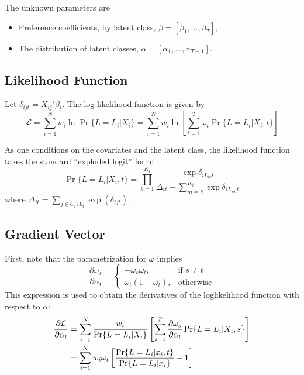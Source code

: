 \documentclass[12pt]{article}
\begin{document}
The unknown parameters are
\begin{itemize}
	\item Preference coefficients, by latent class, $\beta = [\beta_1,\dots, \beta_T]$,
	\item The distribution of latent classes, $\alpha = [\alpha_1,\dots,\alpha_{T-1}]$.
\end{itemize}

\subsection{Likelihood Function}
Let $\delta_{ijt} = X_{ij}'\beta_t$. The log likelihood function is given by
\begin{equation}
	\mathcal{L}
		= 	\sum_{i=1}^N w_i \ln\Pr\{L=L_i|X_i\} = \sum_{i=1}^N w_i \ln\left[\sum_{t=1}^T\omega_t\Pr\{L=L_i|X_i, t\}\right]\label{eq:logl}
\end{equation}

As one conditions on the covariates and the latent class, the likelihood function takes the standard ``exploded logit'' form:
\begin{equation}\label{eq:cond logl}
\Pr\{L=L_i|X_i, t\}
	=	\prod_{k=1}^{K_i}\frac{\exp{\delta_{iL_{ik}t}}}{\Delta_{it} + \sum_{m=k}^{K_i}\exp{\delta_{iL_{im}t}}}
\end{equation}
where $\Delta_{it} = \sum_{j\in{C_i\setminus{}L_i}}\exp(\delta_{ijt})$.



\subsection{Gradient Vector}
First, note that the parametrization for $\omega$ implies
\begin{equation*}
\frac{\partial\omega_s}{\partial\alpha_t} = \left\{
\begin{array}{ll}
-\omega_s\omega_t,      & \text{if $s\neq t$} \\
\omega_t(1 - \omega_t), & \text{otherwise}
\end{array}\right.
\end{equation*}
This expression is used to obtain the derivatives of the loglikelihood function with respect to $\alpha$:
\begin{align}
\frac{\partial\mathcal{L}}{\partial{\alpha_t}}
	&= 	\sum_{i=1}^N\frac{w_i}{\Pr\{L=L_i|X_i\}}
		\left[
			\sum_{s=1}^T\frac{\partial\omega_s}{\partial{\alpha_t}}\Pr\{L=L_i|X_i,s\}
		\right]\notag\\
	&=	\sum_{i=1}^N w_i\omega_t\left[\frac{\Pr\{L=L_i|x_i, t\}}{\Pr\{L=L_i|x_i\}}-1\right]\label{eq:dlogl alpha}
\end{align}
\end{document}
